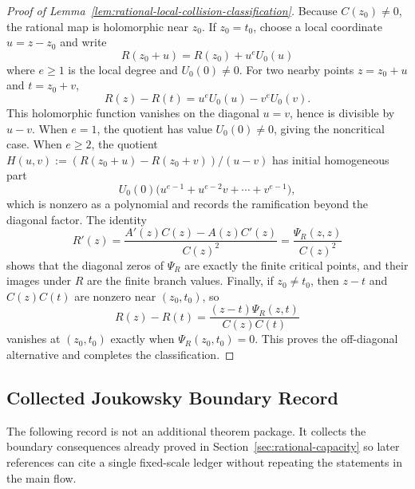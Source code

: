 \begin{proof}[Proof of Lemma~\ref{lem:rational-local-collision-classification}]
Because \(C(z_0)\ne0\), the rational map is holomorphic near \(z_0\).  If \(z_0=t_0\), choose a local coordinate \(u=z-z_0\) and write
\[
R(z_0+u)=R(z_0)+u^e U_0(u)
\]
where \(e\ge1\) is the local degree and \(U_0(0)\ne0\).  For two nearby points \(z=z_0+u\) and \(t=z_0+v\),
\[
R(z)-R(t)=u^eU_0(u)-v^eU_0(v).
\]
This holomorphic function vanishes on the diagonal \(u=v\), hence is divisible by \(u-v\).  When \(e=1\), the quotient has value \(U_0(0)\ne0\), giving the noncritical case.  When \(e\ge2\), the quotient \(H(u,v):=(R(z_0+u)-R(z_0+v))/(u-v)\) has initial homogeneous part
\[
U_0(0)\bigl(u^{e-1}+u^{e-2}v+\cdots+v^{e-1}\bigr),
\]
which is nonzero as a polynomial and records the ramification beyond the diagonal factor.  The identity
\[
R'(z)=\frac{A'(z)C(z)-A(z)C'(z)}{C(z)^2}=\frac{\Psi_R(z,z)}{C(z)^2}
\]
shows that the diagonal zeros of \(\Psi_R\) are exactly the finite critical points, and their images under \(R\) are the finite branch values.  Finally, if \(z_0\ne t_0\), then \(z-t\) and \(C(z)C(t)\) are nonzero near \((z_0,t_0)\), so
\[
R(z)-R(t)=\frac{(z-t)\Psi_R(z,t)}{C(z)C(t)}
\]
vanishes at \((z_0,t_0)\) exactly when \(\Psi_R(z_0,t_0)=0\).  This proves the off-diagonal alternative and completes the classification.
\end{proof}

\subsection{Collected Joukowsky Boundary Record}\label{subsec:collected-joukowsky-boundary-record}

The following record is not an additional theorem package.  It collects
the boundary consequences already proved in Section~\ref{sec:rational-capacity}
so later references can cite a single fixed-scale ledger without
repeating the statements in the main flow.

